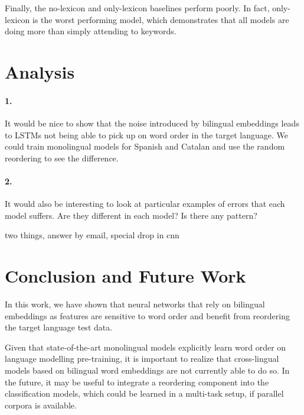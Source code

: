 \documentclass[11pt,a4paper]{article}
\begin{document}
Finally, the no-lexicon and only-lexicon baselines perform poorly. In fact, only-lexicon is the worst performing model, which demonstrates that all models are doing more than simply attending to keywords.



\section{Analysis}

\paragraph{1. }It would be nice to show that 
the noise introduced by bilingual 
embeddings leads to LSTMs not 
being able to pick up on word 
order in the target language.
We could train monolingual models 
for Spanish and Catalan and use the 
random reordering to see the 
difference.

\paragraph{2. }It would also be interesting 
to look at particular examples 
of errors that each model suffers.
Are they different in each model?
Is there any pattern?

two things, answer by email, special drop in cnn


\section{Conclusion and Future Work}

In this work, we have shown that neural networks that rely on bilingual embeddings as features
are sensitive to word order and benefit from reordering the target language test data. 

Given that state-of-the-art monolingual models explicitly learn word order on language modelling pre-training, it is important to realize that cross-lingual models based on bilingual word embeddings are not currently able to do so. In the future, it may be useful to integrate a reordering component into the classification models, which could be learned in a multi-task setup, if parallel corpora is available.




\end{document}
